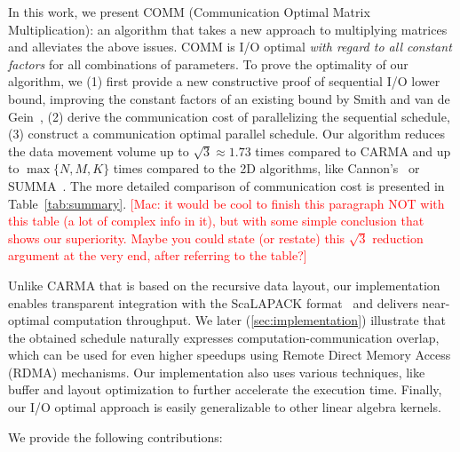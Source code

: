 \documentclass[sigplan,review,anonymous]{acmart}\settopmatter{printfolios=true,printccs=false,printacmref=false}
\newcommand\greg[1]{\textcolor{blue}{[Greg: #1]}}
\newcommand\mac[1]{\textcolor{red}{[Mac: #1]}}
\begin{document}
In this work, we present COMM (Communication Optimal Matrix Multiplication): 
an algorithm that takes a new approach to multiplying
matrices and alleviates the above issues. COMM is I/O optimal \emph{with regard 
to all constant factors}
for all combinations of parameters.
%
To prove the optimality of our algorithm,  we (1) first provide a new 
constructive proof of sequential I/O lower bound, improving the constant 
factors of an existing bound 
by Smith and van de Gein~\cite{tightMMM}, (2) derive the communication cost of  
parallelizing the sequential
schedule, (3) construct a
communication optimal parallel schedule. Our algorithm reduces the data 
movement volume up to $\sqrt{3} \approx 1.73$ times compared to CARMA and up to 
$\max\{N,M,K\}$ times compared to the 2D
algorithms, like Cannon's~\cite{generalCannon}
or SUMMA~\cite{summa}. The more detailed comparison of communication cost is
presented in Table~\ref{tab:summary}.  \mac{it would be cool to finish this
paragraph NOT with  this table (a lot of complex info in it), but with some
simple conclusion that shows our superiority. Maybe you could state (or
restate) this $\sqrt{3}$ reduction argument at the very end, after referring to
the table?}
%

Unlike CARMA that is based on the recursive data layout, our implementation
enables transparent integration with the ScaLAPACK
format~\cite{scalapackLayout} and delivers near-optimal computation throughput.
%
We later (\cref{sec:implementation}) illustrate that the obtained schedule 
naturally expresses
computation-communication overlap, 
%
%
 which can 
be used for even higher speedups
using Remote Direct Memory Access (RDMA) mechanisms.
%
Our implementation
also uses various techniques, like buffer and layout optimization to further
accelerate the execution time. Finally, our I/O optimal approach is
easily generalizable to other linear algebra kernels. 

We provide the following contributions:
\end{document}
